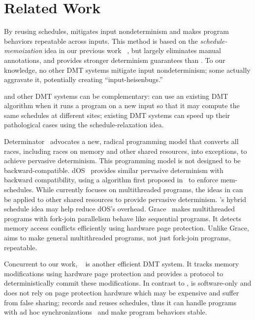\section{Related Work} \label{sec:peregrine-related}

By reusing schedules, \peregrine mitigates input nondeterminism and makes
program behaviors repeatable across inputs.  This method is based on the
\emph{schedule-memoization} idea in our previous work
\tern~\cite{cui:tern:osdi10}, but \peregrine largely eliminates manual annotations,
and provides stronger determinism guarantees than \tern.  To our
knowledge, no other DMT systems mitigate input nondeterminism; some
actually aggravate it, potentially creating ``input-heisenbugs.''

\peregrine and other DMT systems can be complementary: \peregrine can use an
existing DMT algorithm when it runs a program on a new input
so that it may compute the same schedules at different sites;
existing DMT systems can speed up their pathological cases using the
schedule-relaxation idea.

Determinator~\cite{determinator:osdi10}
advocates a new, radical programming model that converts all races,
including races on memory and other shared resources, into exceptions, to
achieve pervasive determinism.  This programming model is not designed to
be backward-compatible.  dOS~\cite{dos:osdi10} provides similar pervasive
determinism with backward compatibility, using a \dmt algorithm first
proposed in~\cite{dmp:asplos09} to enforce mem-schedules.  While \peregrine
currently focuses on multithreaded programs, the ideas in \peregrine can be
applied to other shared resources to provide pervasive determinism.
\peregrine's hybrid schedule idea may help
reduce dOS's overhead.  Grace~\cite{grace:oopsla09} makes multithreaded
programs with fork-join parallelism behave like sequential programs.  It
detects memory access conflicts efficiently using hardware page
protection.  Unlike Grace, \peregrine aims to make general multithreaded
programs, not just fork-join programs, repeatable.  

Concurrent to our work, \dthreads~\cite{dthreads:sosp11} is another
efficient DMT system.  It tracks memory modifications using hardware page
protection and provides a protocol to deterministically commit these
modifications.  In contrast to \dthreads, \peregrine is software-only and does not
rely on page protection hardware which may be expensive and suffer from
false sharing; \peregrine records and reuses schedules, thus it can handle
programs with ad hoc synchronizations~\cite{syncfinder:osdi10} and make
program behaviors stable.

